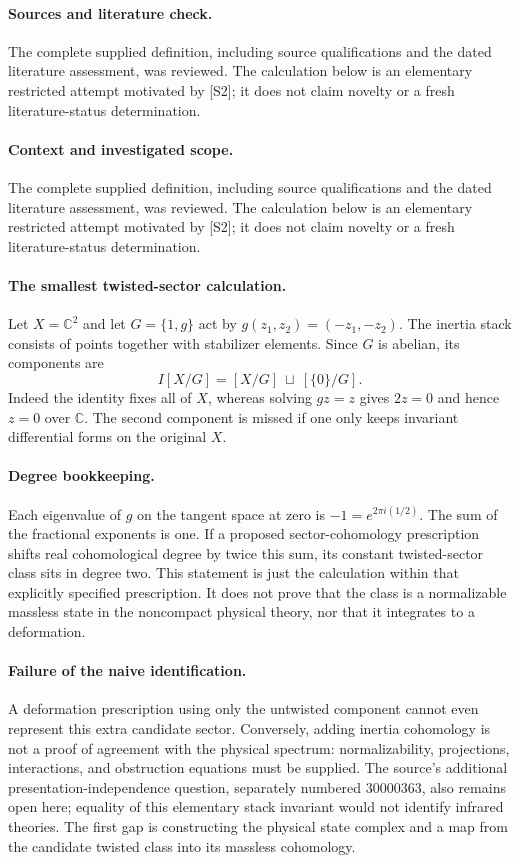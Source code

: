 \documentclass[11pt]{article}
\begin{document}
\paragraph{Sources and literature check.}
The complete supplied definition, including source qualifications and the dated literature assessment, was reviewed. The calculation below is an elementary restricted attempt motivated by [S2]; it does not claim novelty or a fresh literature-status determination.

\paragraph{Context and investigated scope.} The complete supplied definition, including source qualifications and the dated literature assessment, was reviewed. The calculation below is an elementary restricted attempt motivated by [S2]; it does not claim novelty or a fresh literature-status determination.

\paragraph{The smallest twisted-sector calculation.} Let $X=\mathbb C^2$ and let $G=\{1,g\}$ act by $g(z_1,z_2)=(-z_1,-z_2)$. The inertia stack consists of points together with stabilizer elements. Since $G$ is abelian, its components are
\[
 I[X/G]=[X/G]\ \sqcup\ [\{0\}/G].
\]
Indeed the identity fixes all of $X$, whereas solving $gz=z$ gives $2z=0$ and hence $z=0$ over $\mathbb C$. The second component is missed if one only keeps invariant differential forms on the original $X$.

\paragraph{Degree bookkeeping.} Each eigenvalue of $g$ on the tangent space at zero is $-1=e^{2\pi i(1/2)}$. The sum of the fractional exponents is one. If a proposed sector-cohomology prescription shifts real cohomological degree by twice this sum, its constant twisted-sector class sits in degree two. This statement is just the calculation within that explicitly specified prescription. It does not prove that the class is a normalizable massless state in the noncompact physical theory, nor that it integrates to a deformation.

\paragraph{Failure of the naive identification.} A deformation prescription using only the untwisted component cannot even represent this extra candidate sector. Conversely, adding inertia cohomology is not a proof of agreement with the physical spectrum: normalizability, projections, interactions, and obstruction equations must be supplied. The source's additional presentation-independence question, separately numbered 30000363, also remains open here; equality of this elementary stack invariant would not identify infrared theories. The first gap is constructing the physical state complex and a map from the candidate twisted class into its massless cohomology.
\end{document}
